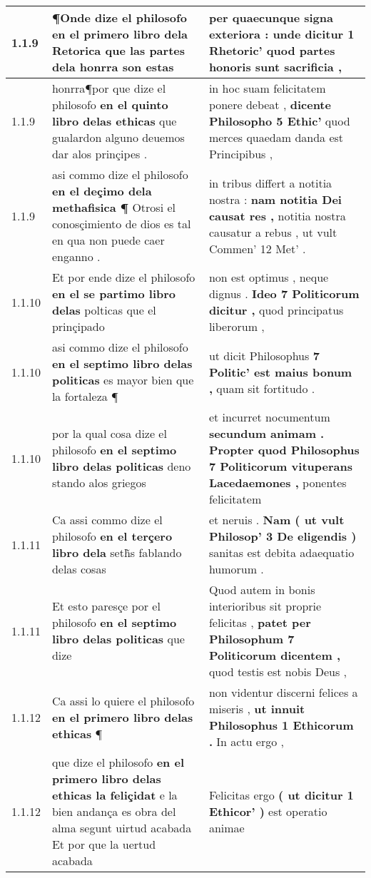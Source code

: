 \begin{tabular}{|p{1cm}|p{6.5cm}|p{6.5cm}|}
1.1.9 & ¶Onde dize el philosofo \textbf{ en el primero libro dela Retorica } que las partes dela honrra son estas & per quaecunque signa exteriora : \textbf{ unde dicitur 1 Rhetoric’ } quod partes honoris sunt sacrificia , \\\hline
1.1.9 & honrra¶por que dize el philosofo \textbf{ en el quinto libro delas ethicas } que gualardon alguno deuemos dar alos prinçipes . & in hoc suam felicitatem ponere debeat , \textbf{ dicente Philosopho 5 Ethic’ } quod merces quaedam danda est Principibus , \\\hline
1.1.9 & asi commo dize el philosofo \textbf{ en el deçimo dela methafisica ¶ } Otrosi el conosçimiento de dios es tal en qua non puede caer enganno . & in tribus differt a notitia nostra : \textbf{ nam notitia Dei causat res , } notitia nostra causatur a rebus , ut vult Commen’ 12 Met’ . \\\hline
1.1.10 & Et por ende dize el philosofo \textbf{ en el se partimo libro delas } polticas que el prinçipado & non est optimus , neque dignus . \textbf{ Ideo 7 Politicorum dicitur , } quod principatus liberorum , \\\hline
1.1.10 & asi commo dize el philosofo \textbf{ en el septimo libro delas politicas } es mayor bien que la fortaleza ¶ & ut dicit Philosophus \textbf{ 7 Politic’ est maius bonum , } quam sit fortitudo . \\\hline
1.1.10 & por la qual cosa dize el philosofo \textbf{ en el septimo libro delas politicas } deno stando alos griegos & et incurret nocumentum \textbf{ secundum animam . Propter quod Philosophus 7 Politicorum vituperans Lacedaemones , } ponentes felicitatem \\\hline
1.1.11 & Ca assi commo dize el philosofo \textbf{ en el terçero libro dela } seth̃s fablando delas cosas & et neruis . \textbf{ Nam ( ut vult Philosop’ 3 De eligendis ) } sanitas est debita adaequatio humorum . \\\hline
1.1.11 & Et esto paresçe por el philosofo \textbf{ en el septimo libro delas politicas } que dize & Quod autem in bonis interioribus sit proprie felicitas , \textbf{ patet per Philosophum 7 Politicorum dicentem , } quod testis est nobis Deus , \\\hline
1.1.12 & Ca assi lo quiere el philosofo \textbf{ en el primero libro delas ethicas } ¶ & non videntur discerni felices a miseris , \textbf{ ut innuit Philosophus 1 Ethicorum . } In actu ergo , \\\hline
1.1.12 & que dize el philosofo \textbf{ en el primero libro delas ethicas la feliçidat } e la bien andança es obra del alma segunt uirtud acabada Et por que la uertud acabada & Felicitas ergo \textbf{ ( ut dicitur 1 Ethicor’ ) } est operatio animae \\\hline

\end{tabular}
